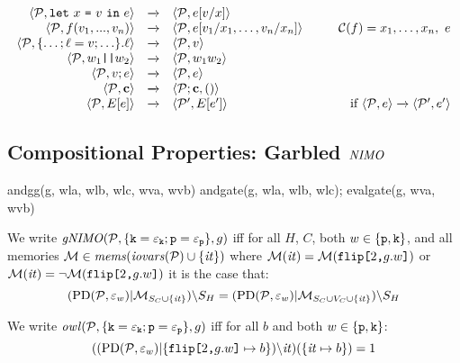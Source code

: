 $$
\begin{array}{rcl@{\hspace{10mm}}r}
\config{\prog}{\elet{x}{v}{e}} &\redx& \config{\prog}{e[v/x]}\\
\config{\prog}{f(v_1,...,v_n)} &\redx&
\config{\prog}{e[v_1/x_1,\ldots,v_n/x_n]} & 
 \codebase(f) = x_1,\ldots,x_n,\ e\\
\config{\prog}{\{\ldots; \flab = v; \ldots\}.\flab} &\redx&
 \config{\prog}{v}\\
 \config{\prog}{w_1\ttt{||}w_2} &\redx& \config{\prog}{w_1w_2}\\
 \config{\prog}{v;e} &\redx& \config{\prog}{e}\\
\config{\prog}{\instr} &\redx& \config{\prog;\instr}{()}\\
\config{\prog}{E[e]} &\redx& \config{\prog'}{E[e']} & \text{if}\ \config{\prog}{e} \redx \config{\prog'}{e'} 
\end{array}
$$

\subsection{Compositional Properties: Garbled $\mathit{NIMO}$}

\begin{verbatimtab}
andgg(g, wla, wlb, wlc, wva, wvb) {
andgate(g, wla, wlb, wlc);
evalgate(g, wva, wvb)
}
\end{verbatimtab}

\begin{definition}
  We write $\mathit{gNIMO}(\mathcal{P},\{ \texttt{k} = \varepsilon_{\texttt{k}}; \texttt{p} = \varepsilon_{\texttt{p}}\}, g)$ iff for all $H$, $C$,
  both $w \in \{\texttt{p},\texttt{k}\}$, and all 
  memories $\mathcal{M} \in \mathit{mems}(\mathit{iovars}(\mathcal{P}) \cup \{ \mathit{it} \})$ where
  $
  \mathcal{M}(\mathit{it}) = \mathcal{M}(\texttt{flip[}2\texttt{,}g.w\texttt{]})$ or $\mathcal{M}(\mathit{it}) = \neg\mathcal{M}(\texttt{flip[}2\texttt{,}g.w\texttt{]})
  $
  it is the case that:
  $$
  (\mathrm{PD}(\mathcal{P},\varepsilon_w)|\mathcal{M}_{S_C \cup \{\mathit{it} \}})\backslash S_H =
  (\mathrm{PD}(\mathcal{P},\varepsilon_w)|\mathcal{M}_{S_C \cup V_C \cup \{\mathit{it} \}})\backslash S_H
  $$
\end{definition}

\begin{definition}
  We write $\mathit{owl}(\mathcal{P}, \{ \texttt{k} = \varepsilon_{\texttt{k}}; \texttt{p} = \varepsilon_{\texttt{p}}\}, g)$
  iff for all $b$ and both $w \in \{\texttt{p},\texttt{k}\}$:
  $$
  ((\mathrm{PD}(\mathcal{P},\varepsilon_{w})|\{ \texttt{flip[}2\texttt{,}g.w\texttt{]} \mapsto b \})\backslash\mathit{it})(\{ \mathit{it} \mapsto b\}) = 1
  $$
\end{definition}

